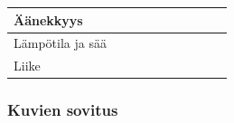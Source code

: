 \documentclass[finnish, 12pt, a4paper, elec, utf8, a-1b, online]{aaltothesis}
\begin{document}
{\begin{longtable}{p{2.5cm}|p{6cm}|p{0.5cm}p{0.5cm}p{0.5cm}|p{0.5cm}|p{0.5cm}p{0.5cm}p{0.5cm}|p{0.5cm}|}
        \midrule
        Äänekkyys                                                                                                                                                                                                                                                                                                                                                                                                                   \\
        \midrule
        Lämpötila ja sää                                                                                                                                                                                                                                                                                                                                                                                                            \\
        \midrule
        Liike                                                                                                                                                                                                                                                                                                                                                                                                                       \\
    \end{longtable}
}

\subsubsection{Kuvien sovitus}
\end{document}
